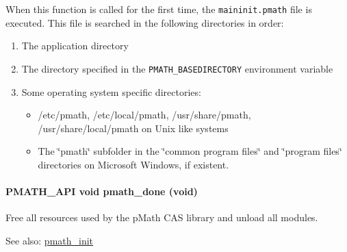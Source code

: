 When this function is called for the first time, the {\tt maininit.pmath} file is executed. This file is searched in the following directories in order:\begin{enumerate}
\item The application directory\item The directory specified in the {\tt PMATH\_\-BASEDIRECTORY} environment variable\item Some operating system specific directories:\begin{itemize}
\item /etc/pmath, /etc/local/pmath, /usr/share/pmath, /usr/share/local/pmath on Unix like systems\item The \char`\"{}pmath\char`\"{} subfolder in the \char`\"{}common program files\char`\"{} and \char`\"{}program files\char`\"{} directories on Microsoft Windows, if existent. \end{itemize}
\end{enumerate}
\hypertarget{group__frontend_g012705e1fd248a7cebf738bae6375dd9}{
\paragraph[{pmath\_\-done}]{\setlength{\rightskip}{0pt plus 5cm}PMATH\_\-API void pmath\_\-done (void)}\hfill}
\label{group__frontend_g012705e1fd248a7cebf738bae6375dd9}


Free all resources used by the pMath CAS library and unload all modules. 

\begin{Desc}
\item[See also:]\hyperlink{group__frontend_gfb9f2c789bee5295c6794d16c0164943}{pmath\_\-init} \end{Desc}
